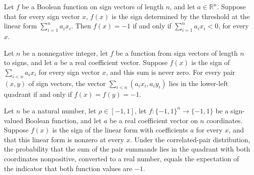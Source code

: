 \begin{theorem}
\label{FABL.homogeneousThreshold_eq_neg_one_iff}
\leanok
{}
Let $f$ be a Boolean function on sign vectors of length $n$, and let $a\in\mathbb{R}^n$.
Suppose that for every sign vector $x$, $f(x)$ is the sign determined by the threshold
at the linear form $\sum_{i=1}^n a_i x_i$. Then $f(x)=-1$ if and only if $\sum_{i=1}^n
a_i x_i<0$, for every $x$.
\end{theorem}

\begin{theorem}
\label{FABL.regularThresholdPairSum_mem_lowerLeft_iff}
\leanok
{}
Let $n$ be a nonnegative integer, let $f$ be a function from sign vectors of length $n$
to signs, and let $a$ be a real coefficient vector. Suppose $f(x)$ is the sign of
$\sum_{i<n}a_i x_i$ for every sign vector $x$, and this sum is never zero. For every
pair $(x,y)$ of sign vectors, the vector $\sum_{i<n}(a_i x_i,a_i y_i)$ lies in the
lower-left quadrant if and only if $f(x)=f(y)=-1$.
\end{theorem}

\begin{theorem}
\label{FABL.regularThresholdPair_lowerLeftProbability_eq}
\leanok
{}
Let $n$ be a natural number, let $\rho\in[-1,1]$, let $f\colon\{-1,1\}^n\to\{-1,1\}$ be
a sign-valued Boolean function, and let $a$ be a real coefficient vector on $n$
coordinates. Suppose $f(x)$ is the sign of the linear form with coefficients $a$ for
every $x$, and that this linear form is nonzero at every $x$. Under the correlated-pair
distribution, the probability that the sum of the pair summands lies in the quadrant
with both coordinates nonpositive, converted to a real number, equals the expectation of
the indicator that both function values are $-1$.
\end{theorem}


